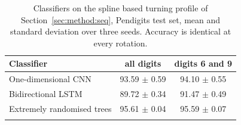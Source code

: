 \begin{table}[t]
\caption{Classifiers on the spline based turning profile of
Section~\ref{sec:method:seq}, Pendigits test set, mean and standard deviation
over three seeds. Accuracy is identical at every rotation.}
\label{tab:seq}
\begin{tabular}{lcc}
\toprule
Classifier & all digits & digits 6 and 9\\
\midrule
One-dimensional CNN & 93.59 $\pm$ 0.59 & 94.10 $\pm$ 0.55\\
Bidirectional LSTM & 89.72 $\pm$ 0.34 & 91.47 $\pm$ 0.49\\
Extremely randomised trees & 95.61 $\pm$ 0.04 & 95.59 $\pm$ 0.07\\
\botrule
\end{tabular}
\end{table}
